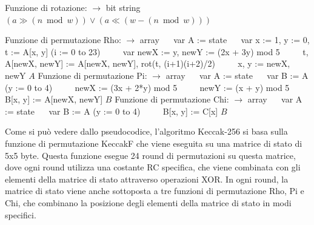 \documentclass[a4paper,11pt]{report}
\begin{document}
\begin{algorithm}
\begin{algorithmic}[1]
\State Funzione di rotazione:
 $\rightarrow$ {bit string}
\State $\quad$ \Return $(a \gg (n \bmod w)) \lor (a \ll (w - (n \bmod w)))$
\EndFunction

\State Funzione di permutazione Rho:
 $\rightarrow$ {array}
\State $\quad$ var A := state
\State $\quad$ var x := 1, y := 0, t := A[x, y]
\For(i := 0 to 23)
\State $\quad\quad$ var newX := y, newY := (2x + 3y) mod 5
\State $\quad\quad$ t, A[newX, newY] := A[newX, newY], rot(t, (i+1)(i+2)/2)
\State $\quad\quad$ x, y := newX, newY
\EndFor
\EndFor
\State \Return $A$
\EndFunction
\State Funzione di permutazione Pi:
 $\rightarrow$ {array}
\State $\quad$ var A := state
\State $\quad$ var B := A
\For(y := 0 to 4)
\State $\quad\quad$ newX := (3x + 2*y) mod 5
\State $\quad\quad$ newY := (x + y) mod 5
\State $\quad\quad$ B[x, y] := A[newX, newY]
\EndFor
\EndFor
\State \Return $B$
\EndFunction
\State Funzione di permutazione Chi:
 $\rightarrow$ {array}
\State $\quad$ var A := state
\State $\quad$ var B := A
\For(y := 0 to 4)
    \State $\quad\quad$ B[x, y] := C[x]
\EndFor
\State \Return $B$
\EndFunction
\end{algorithmic}
\end{algorithm}

\newpage
Come si può vedere dallo pseudocodice, l'algoritmo Keccak-256 si basa sulla funzione di permutazione KeccakF che viene eseguita su una matrice di stato di 5x5 byte. Questa funzione esegue 24 round di permutazioni su questa matrice, dove ogni round utilizza una costante RC specifica, che viene combinata con gli elementi della matrice di stato attraverso operazioni XOR. In ogni round, la matrice di stato viene anche sottoposta a tre funzioni di permutazione Rho, Pi e Chi, che combinano la posizione degli elementi della matrice di stato in modi specifici.
\end{document}
